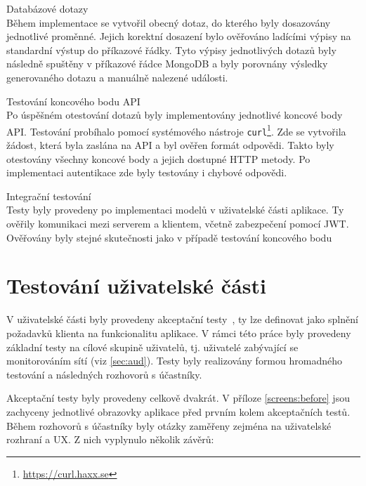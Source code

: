 \begin{description}
    \item Databázové dotazy\\
        Během implementace se vytvořil obecný dotaz, do kterého byly dosazovány jednotlivé proměnné. Jejich korektní dosazení bylo ověřováno ladícími výpisy na standardní výstup do příkazové řádky. Tyto výpisy jednotlivých dotazů byly následně spuštěny v příkazové řádce MongoDB a byly porovnány výsledky generovaného dotazu a manuálně nalezené události.

    \item Testování koncového bodu API\\
        Po úspěšném otestování dotazů byly implementovány jednotlivé koncové body API. Testování probíhalo pomocí systémového nástroje \texttt{curl}\footnote{\url{https://curl.haxx.se}}. Zde se vytvořila žádost, která byla zaslána na API a byl ověřen formát odpovědi. Takto byly otestovány všechny koncové body a jejich dostupné HTTP metody. Po implementaci autentikace zde byly testovány i chybové odpovědi.

    \item Integrační testování\\
        Testy byly provedeny po implementaci modelů v uživatelské části aplikace. Ty ověřily komunikaci mezi serverem a klientem, včetně zabezpečení pomocí JWT. Ověřovány byly stejné skutečnosti jako v případě testování koncového bodu

\end{description}

\section{Testování uživatelské části}

V uživatelské části byly provedeny akceptační testy~\cite{acp:tests}, ty lze definovat jako splnění požadavků klienta na funkcionalitu aplikace. V rámci této práce byly provedeny základní testy na cílové skupině uživatelů, tj. uživatelé zabývající se monitorováním sítí (viz \ref{sec:aud}). Testy byly realizovány formou hromadného testování a následných rozhovorů s účastníky.

Akceptační testy byly provedeny celkově dvakrát. V příloze \ref{screens:before} jsou zachyceny jednotlivé obrazovky aplikace před prvním kolem akceptačních testů. Během rozhovorů s účastníky byly otázky zaměřeny zejména na uživatelské rozhraní a UX. Z nich vyplynulo několik závěrů:

